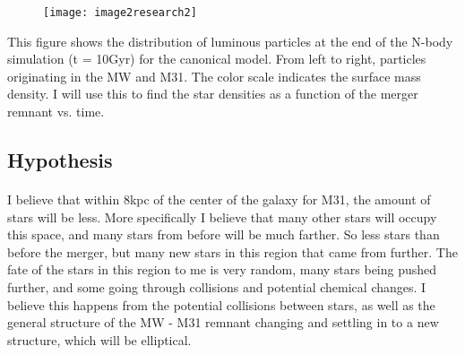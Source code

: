 \documentclass{report}
\begin{document}
\begin{figure}[h]
\graphicspath{ {/home/} }
\texttt{[image: image2research2]}
\end{figure}

This figure shows the distribution of luminous particles at the end of the N-body simulation (t = 10Gyr) for the canonical model. From left to right, particles originating in the MW and M31. The color scale indicates the surface mass density. I will use this to find the star densities as a function of the merger remnant vs. time. 

\subsection*{Hypothesis}
\paragraph{}

I believe that within 8kpc of the center of the galaxy for M31, the amount of stars will be less. More specifically I believe that many other stars will occupy this space, and many stars from before will be much farther. So less stars than before the merger, but many new stars in this region that came from further. The fate of the stars in this region to me is very random, many stars being pushed further, and some going through collisions and potential chemical changes. I believe this happens from the potential collisions between stars, as well as the general structure of the MW - M31 remnant changing and settling in to a new structure, which will be elliptical.
\end{document}
